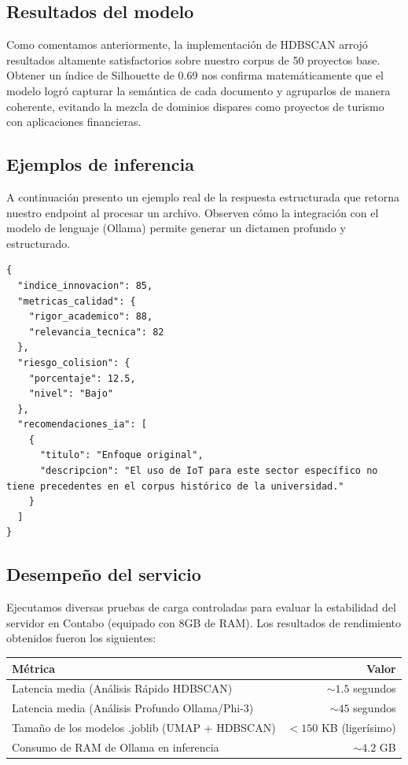 

\subsection{Resultados del modelo}

Como comentamos anteriormente, la implementación de HDBSCAN arrojó resultados altamente satisfactorios sobre nuestro corpus de 50 proyectos base. Obtener un índice de Silhouette de 0.69 nos confirma matemáticamente que el modelo logró capturar la semántica de cada documento y agruparlos de manera coherente, evitando la mezcla de dominios dispares como proyectos de turismo con aplicaciones financieras.

\subsection{Ejemplos de inferencia}

A continuación presento un ejemplo real de la respuesta estructurada que retorna nuestro endpoint al procesar un archivo. Observen cómo la integración con el modelo de lenguaje (Ollama) permite generar un dictamen profundo y estructurado.

\begin{lstlisting}[style=jsonstyle]
{
  "indice_innovacion": 85,
  "metricas_calidad": {
    "rigor_academico": 88,
    "relevancia_tecnica": 82
  },
  "riesgo_colision": {
    "porcentaje": 12.5,
    "nivel": "Bajo"
  },
  "recomendaciones_ia": [
    {
      "titulo": "Enfoque original",
      "descripcion": "El uso de IoT para este sector específico no tiene precedentes en el corpus histórico de la universidad."
    }
  ]
}
\end{lstlisting}

\subsection{Desempeño del servicio}

Ejecutamos diversas pruebas de carga controladas para evaluar la estabilidad del servidor en Contabo (equipado con 8GB de RAM). Los resultados de rendimiento obtenidos fueron los siguientes:

\begin{tabular}{@{}lr@{}}
  \toprule
  Métrica & Valor \\
  \midrule
  Latencia media (Análisis Rápido HDBSCAN) & $\sim 1.5$ segundos \\
  Latencia media (Análisis Profundo Ollama/Phi-3) & $\sim 45$ segundos \\
  Tamaño de los modelos .joblib (UMAP + HDBSCAN) & $< 150$ KB (ligerísimo) \\
  Consumo de RAM de Ollama en inferencia & $\sim 4.2$ GB \\
  \bottomrule
\end{tabular}

